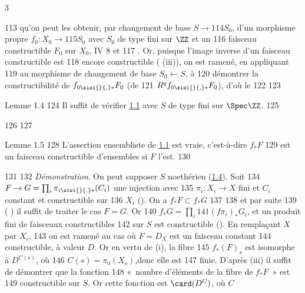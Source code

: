 3	\documentclass[10pt]{../fichiers-configuration-latex/smfart}
\begin{document}
   113	qu'on peut les obtenir, par changement de base $S\rightarrow
   114	S_{0}$, d'un morphisme propre $f_{0}:X_{0}\rightarrow
   115	S_{0}$ avec $S_{0}$ de type fini sur $\ZZ$ et un
   116	faisceau constructible $F_{0}$ sur $X_{0}$, \cf \EGA IV 8 et 
   117	. Or, puisque l'image inverse d'un faisceau constructible est
   118	encore constructible ( (iii)), on est ramené, en appliquant 
   119	 au morphisme de changement de base $S_{0}\leftarrow S$, à
   120	démontrer la constructibilité de $f_{0 \sisi{}{,} \ast} F_{0}$ (\resp de
   121	$R^{q}f_{0 \sisi{}{,} \ast} F_{0}$), d'où le
   122	
   123	\begin{enonce*}{Lemme 1.4}
   124	Il suffit de vérifier \hyperref[XIV.thm1.1]{1.1} avec $S$ de type fini sur $\Spec \ZZ$.
   125	\end{enonce*}
   126	
   127	\begin{enonce*}{Lemme 1.5}
   128	L'assertion ensembliste de \hyperref[XIV.thm1.1]{1.1} est vraie, c'est-à-dire $f_{\ast}F$
   129	est un faisceau constructible d'ensembles si $F$ l'est.
   130	\end{enonce*}
   131	
   132		\emph{Démonstration}. On peut supposer $S$ noethérien (\hyperref[XIV.lem1.4]{1.4}). Soit
   134	$F\rightarrow G=\prod_i\pi_{i \sisi{}{,} \ast}(C_i)$ une injection avec
   135	$\pi_i:X_i\rightarrow X$ fini et $C_i$ constant et constructible sur
   136	$X_i$ (). On a $f_{\ast}F\subset f_{\ast}G$ 
   137	%
   138	et par suite 
   139	( ) il suffit de traiter le cas $F=G$. Or
   140	$f_{\ast}G=\prod_i 
   141	(f\pi_i)_{\ast}G_i$, et un produit fini de faisceaux constructibles
   142	sur $S$ est constructible (). En remplaçant $X$ par $X_i$,
   143	on est ramené au cas où $F=D_X$ est un faisceau constant
   144	constructible, à valeur $D$. Or en vertu de  (i), la fibre
   145	$f_{\ast}(F)_{\bar{s}}$ est isomorphe à $D^{C(s)}$, où
   146	$C(s)=\pi_0(X_{\bar{s}})$,\pageoriginale donc elle est
   147	finie. D'après  (iii) il suffit de démontrer que la fonction
   148	« nombre d'éléments de la fibre de $f_{\ast}F$ »  est
   149	constructible sur $S$. Or cette fonction est $\card(D^{C})$, où $C$
\end{document}
